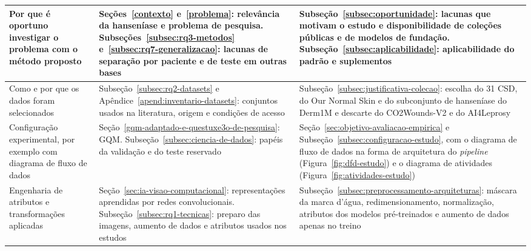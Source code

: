 \begin{longtable}{|>{\raggedright\arraybackslash}p{3.3cm}|>{\raggedright\arraybackslash}p{6.0cm}|>{\raggedright\arraybackslash}p{5.6cm}|}
	\endfoot
	\endlastfoot
	Por que é oportuno investigar o problema com o método proposto
	                            & Seções~\ref{contexto} e~\ref{problema}: relevância da hanseníase e problema de pesquisa. Subseções~\ref{subsec:rq3-metodos} e~\ref{subsec:rq7-generalizacao}: lacunas de separação por paciente e de teste em outras bases
	                            & Subseção~\ref{subsec:oportunidade}: lacunas que motivam o estudo e disponibilidade de coleções públicas e de modelos de fundação. Subseção~\ref{subsec:aplicabilidade}: aplicabilidade do padrão e suplementos                                                                                                                                                       \\ \hline
	Como e por que os dados foram selecionados
	                            & Subseção~\ref{subsec:rq2-datasets} e Apêndice~\ref{apend:inventario-datasets}: conjuntos usados na literatura, origem e condições de acesso
	                            & Subseção~\ref{subsec:justificativa-colecao}: escolha do 31 CSD, do Our Normal Skin e do subconjunto de hanseníase do Derm1M e descarte do CO2Wounds-V2 e do AI4Leprosy                                                                                                                                                                                               \\ \hline
	Configuração experimental, por exemplo com diagrama de fluxo de dados
	                            & Seção~\ref{gqm-adaptado-e-questuxe3o-de-pesquisa}: GQM. Subseção~\ref{subsec:ciencia-de-dados}: papéis da validação e do teste reservado
	                            & Seção~\ref{sec:objetivo-avaliacao-empirica} e Subseção~\ref{subsec:configuracao-estudo}, com o diagrama de fluxo de dados na forma de arquitetura do \textit{pipeline} (Figura~\ref{fig:dfd-estudo}) e o diagrama de atividades (Figura~\ref{fig:atividades-estudo})                                                                                                                                              \\ \hline
	Engenharia de atributos e transformações aplicadas
	                            & Seção~\ref{sec:ia-visao-computacional}: representações aprendidas por redes convolucionais. Subseção~\ref{subsec:rq1-tecnicas}: preparo das imagens, aumento de dados e atributos usados nos estudos
	                            & Subseção~\ref{subsec:preprocessamento-arquiteturas}: máscara da marca d'água, redimensionamento, normalização, atributos dos modelos pré-treinados e aumento de dados apenas no treino                                                                                                                                                                               \\ \hline

\end{longtable}
